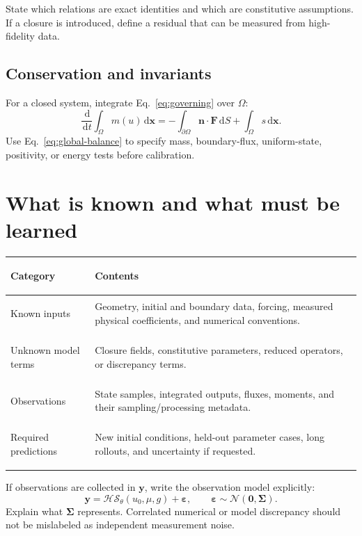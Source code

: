 \documentclass[11pt]{article}
\newcommand{\vect}[1]{\bm{#1}}
\newcommand{\dd}{\,\mathrm d}
\begin{document}
State which relations are exact identities and which are constitutive assumptions. If a closure is introduced, define a residual that can be measured from high-fidelity data.

\subsection{Conservation and invariants}

For a closed system, integrate Eq.~\eqref{eq:governing} over $\Omega$:
\begin{equation}
 \frac{\dd}{\dd t}\int_\Omega m(u)\dd\vect x
 =-\int_{\partial\Omega}\vect n\cdot\vect F\dd S
 +\int_\Omega s\dd\vect x .
 \label{eq:global-balance}
\end{equation}
Use Eq.~\eqref{eq:global-balance} to specify mass, boundary-flux, uniform-state, positivity, or energy tests before calibration.

\section{What is known and what must be learned}

\begin{center}
\begin{tabularx}{0.94\textwidth}{>{\bfseries\raggedright\arraybackslash}p{}Y}
\toprule
Category & Contents \\
\midrule
Known inputs & Geometry, initial and boundary data, forcing, measured physical coefficients, and numerical conventions. \\
Unknown model terms & Closure fields, constitutive parameters, reduced operators, or discrepancy terms. \\
Observations & State samples, integrated outputs, fluxes, moments, and their sampling/processing metadata. \\
Required predictions & New initial conditions, held-out parameter cases, long rollouts, and uncertainty if requested. \\
\bottomrule
\end{tabularx}
\end{center}

If observations are collected in $\vect y$, write the observation model explicitly:
\begin{equation}
 \vect y=\mathcal H\mathcal S_\theta(u_0,\mu,g)+\vect\varepsilon,
 \qquad \vect\varepsilon\sim\mathcal N(\vect0,\vect\Sigma).
 \label{eq:observation}
\end{equation}
Explain what $\vect\Sigma$ represents. Correlated numerical or model discrepancy should not be mislabeled as independent measurement noise.
\end{document}
